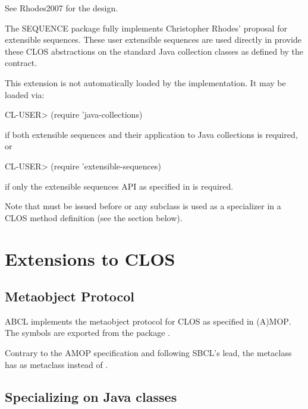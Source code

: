 \documentclass[10pt]{book}
\begin{document}
See Rhodes2007 \cite{RHODES2007} for the design.

The SEQUENCE package fully implements Christopher Rhodes' proposal for
extensible sequences.  These user extensible sequences are used
directly in  provide these CLOS
abstractions on the standard Java collection classes as defined by the
 contract.


This extension is not automatically loaded by the implementation.   It
may be loaded via:

\begin{listing-lisp}
CL-USER> (require 'java-collections)
\end{listing-lisp}

if both extensible sequences and their application to Java collections
is required, or

\begin{listing-lisp}
CL-USER> (require 'extensible-sequences)
\end{listing-lisp}

if only the extensible sequences API as specified in \cite{RHODES2007} is
required.

Note that  must be issued before
 or any subclass is used as a specializer in a \textsc{CLOS}
method definition (see the section below).

\section{Extensions to CLOS}

\subsection{Metaobject Protocol}

\textsc{ABCL} implements the metaobject protocol for \textsc{CLOS} as
specified in \textsc{(A)MOP}.  The symbols are exported from the
package .

Contrary to the AMOP specification and following \textsc{SBCL}'s lead,
the metaclass  has
 as metaclass instead of
.

\subsection{Specializing on Java classes}
\end{document}
